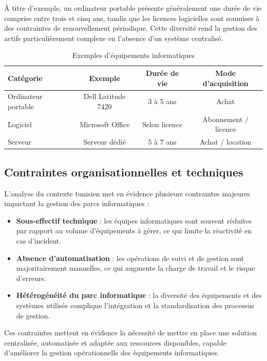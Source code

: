 À titre d’exemple, un ordinateur portable présente généralement une durée de vie comprise entre trois et cinq ans, tandis que les licences logicielles sont soumises à des contraintes de renouvellement périodique. Cette diversité rend la gestion des actifs particulièrement complexe en l’absence d’un système centralisé.

\begin{table}[H]
\centering
\caption{Exemples d’équipements informatiques}
\label{tab:equipements}
\begin{tabular}{|l|c|c|c|}
\hline
\textbf{Catégorie} & \textbf{Exemple} & \textbf{Durée de vie} & \textbf{Mode d’acquisition} \\ \hline
Ordinateur portable & Dell Latitude 7420 & 3 à 5 ans & Achat \\ \hline
Logiciel & Microsoft Office & Selon licence & Abonnement / licence \\ \hline
Serveur & Serveur dédié & 5 à 7 ans & Achat / location \\ \hline
\end{tabular}
\end{table}

\subsection{Contraintes organisationnelles et techniques}

L’analyse du contexte tunisien met en évidence plusieurs contraintes majeures impactant la gestion des parcs informatiques :

\begin{itemize}
    \item \textbf{Sous-effectif technique} : les équipes informatiques sont souvent réduites par rapport au volume d’équipements à gérer, ce qui limite la réactivité en cas d’incident.
    
    \item \textbf{Absence d’automatisation} : les opérations de suivi et de gestion sont majoritairement manuelles, ce qui augmente la charge de travail et le risque d’erreurs.
    
    \item \textbf{Hétérogénéité du parc informatique} : la diversité des équipements et des systèmes utilisés complique l’intégration et la standardisation des processus de gestion.
\end{itemize}

Ces contraintes mettent en évidence la nécessité de mettre en place une solution centralisée, automatisée et adaptée aux ressources disponibles, capable d’améliorer la gestion opérationnelle des équipements informatiques.

